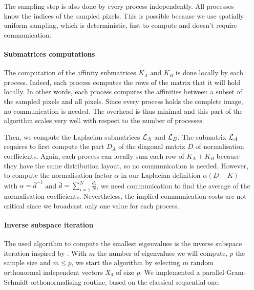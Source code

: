 The sampling step is also done by every process independently.
All processes know the indices of the sampled pixels.
This is possible because we use spatially uniform sampling, which is deterministic, fast to compute and doesn't require communication.

\paragraph{Submatrices computations}
The computation of the affinity submatrices \(K_A\) and \(K_B\) is done locally by each process.
Indeed, each process computes the rows of the matrix that it will hold locally.
In other words, each process computes the affinities between a subset of the sampled pixels and all pixels.
Since every process holds the complete image, no communication is needed.
The overhead is thus minimal and this part of the algorithm scales very well with respect to the number of processes.

Then, we compute the Laplacian submatrices \(\operatorname{\mathcal{L}}_A\) and \(\operatorname{\mathcal{L}}_B\).
The submatrix \(\operatorname{\mathcal{L}}_A\) requires to first compute the part \(D_A\) of the diagonal matrix \(D\) of normalisation coefficients.
Again, each process can locally sum each row of \(K_A + K_B\) because they have the same distribution layout, so no communication is needed.
However, to compute the normalisation factor \(\alpha\) in our Laplacian definition \(\alpha (D - K)\) with \(\alpha = \bar{d}^{-1}\) and \(\bar{d} = \sum^N_{i=1} \frac{d_i}{N}\), we need communication to find the average of the normalisation coefficients.
Nevertheless, the implied communication costs are not critical since we broadcast only one value for each process.

\paragraph{Inverse subspace iteration}
The used algorithm to compute the smallest eigenvalues is the inverse subspace iteration inspired by \cite{el_khoury_acceleration_2014}.
With \(m\) the number of eigenvalues we will compute, \(p\) the sample size and \(m \le p\), we start the algorithm by selecting \(m\) random orthonormal independent vectors \(X_0\) of size \(p\).
We implemented a parallel Gram-Schmidt orthonormalising routine, based on the classical sequential one.

